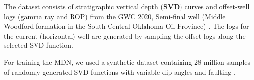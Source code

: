 
The dataset consists of stratigraphic vertical depth (\textbf{SVD}) curves and offset-well logs (gamma ray and ROP) from the GWC 2020, Semi-final well (Middle Woodford formation in the South Central Oklahoma Oil Province) \cite{gwc-paper}. 
The logs for the current (horizontal) well are generated by sampling the offset logs along the selected SVD function.


For training the MDN, we used a synthetic dataset containing 28 million samples of randomly generated SVD functions with variable dip angles and faulting \cite{trainingdata}.